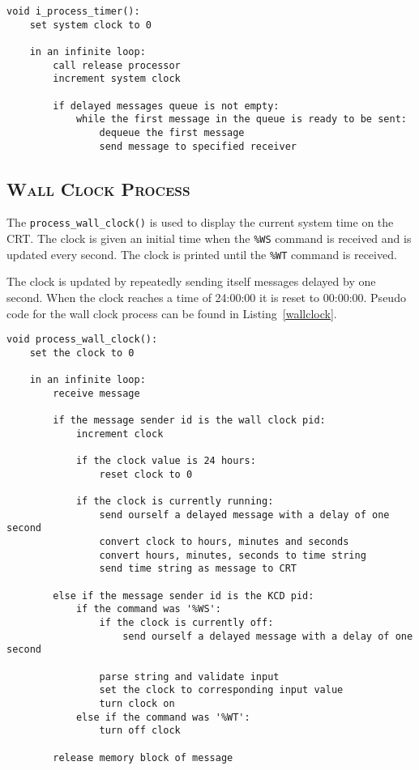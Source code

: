 \documentclass[oneside]{report}
\begin{document}
\begin{lstlisting}
void i_process_timer():
    set system clock to 0

    in an infinite loop:
        call release processor
        increment system clock

        if delayed messages queue is not empty:
            while the first message in the queue is ready to be sent:
                dequeue the first message
                send message to specified receiver        
\end{lstlisting}

\subsection{\textsc{Wall Clock Process}}
The \texttt{process\_wall\_clock()} is used to display the current
system time on the CRT. The clock is given an initial time when the
\texttt{\%WS} command is received and is updated every second. The
clock is printed until the \texttt{\%WT} command is received.

The clock is updated by repeatedly sending itself messages delayed by
one second. When the clock reaches a time of 24:00:00 it is reset to
00:00:00. Pseudo code for the wall clock process can be found in
Listing~\ref{wallclock}.

\begin{lstlisting}
void process_wall_clock():
    set the clock to 0

    in an infinite loop:
        receive message

        if the message sender id is the wall clock pid:
            increment clock

            if the clock value is 24 hours:
                reset clock to 0

            if the clock is currently running:
                send ourself a delayed message with a delay of one second
                convert clock to hours, minutes and seconds
                convert hours, minutes, seconds to time string
                send time string as message to CRT

        else if the message sender id is the KCD pid:
            if the command was '%WS':
                if the clock is currently off:
                    send ourself a delayed message with a delay of one second

                parse string and validate input
                set the clock to corresponding input value
                turn clock on
            else if the command was '%WT':
                turn off clock

        release memory block of message
\end{lstlisting}
\end{document}

